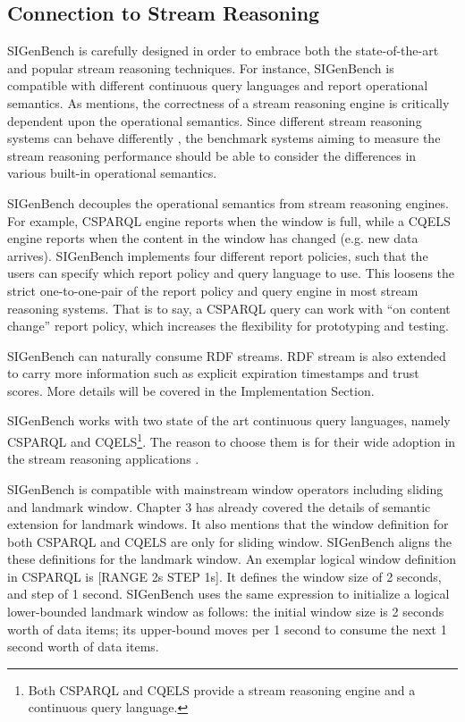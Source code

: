 \subsection{Connection to Stream Reasoning}
SIGenBench is carefully designed in order to embrace both the state-of-the-art and popular stream reasoning techniques.
For instance, SIGenBench is compatible with different continuous query languages and report operational semantics. 
As \cite{dell2013correctness} mentions, the correctness of a stream reasoning engine is critically dependent upon the operational semantics. 
Since different stream reasoning systems can behave differently \cite{botan2010secret}, the benchmark systems aiming to measure the stream reasoning performance should be able to consider the differences in various built-in operational semantics.

SIGenBench decouples the operational semantics from stream reasoning engines.
For example, CSPARQL engine reports when the window is full, while a CQELS engine reports when the content in the window has changed (e.g. new data arrives). 
SIGenBench implements four different report policies, such that the users can specify which report policy and query language to use.
This loosens the strict one-to-one-pair of the report policy and query engine in most stream reasoning systems. 
That is to say, a CSPARQL query can work with ``on content change'' report policy, which increases the flexibility for prototyping and testing.

SIGenBench can naturally consume RDF streams.
RDF stream is also extended to carry more information such as explicit expiration timestamps and trust scores.
More details will be covered in the Implementation Section. 

SIGenBench works with two state of the art continuous query languages, namely CSPARQL and CQELS\footnote{Both CSPARQL and CQELS provide a stream reasoning engine and a continuous query language.}.
The reason to choose them is for their wide adoption in the stream reasoning applications \cite{dao2015towards} \cite{kolchin2014web} \cite{dejonghec} \cite{okure2013querying}.

SIGenBench is compatible with mainstream window operators including sliding and landmark window.
Chapter 3 has already covered the details of semantic extension for landmark windows.
It also mentions that the window definition for both CSPARQL and CQELS are only for sliding window.
SIGenBench aligns the these definitions for the landmark window. 
An exemplar logical window definition in CSPARQL is [RANGE 2s STEP 1s].
It defines the window size of 2 seconds, and step of 1 second. 
SIGenBench uses the same expression to initialize a logical lower-bounded landmark window as follows: 
the initial window size is 2 seconds worth of data items; its upper-bound moves per 1 second to consume the next 1 second worth of data items. 
%
